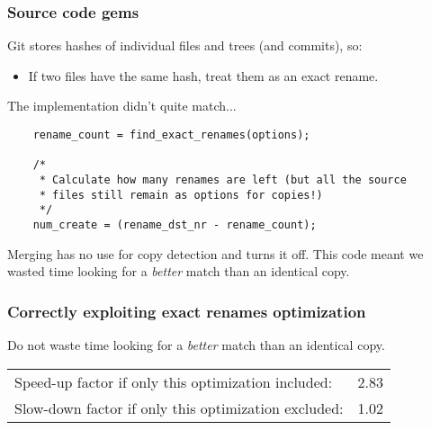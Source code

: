 \documentclass[compress,t]{beamer}
\begin{document}
\begin{frame}[fragile]
  \frametitle{Source code gems}

  Git stores hashes of individual files and trees (and commits), so:
  \begin{itemize}
    \item If two files have the same hash, treat them as an exact rename.
  \end{itemize}

  \pause
  \vspace*{1.0\baselineskip}
  The implementation didn't quite match...\\
  \vspace*{0.5\baselineskip}
  \qquad
  \begin{minipage}{0.8\textwidth}
  {\footnotesize
  \begin{verbatim}
	rename_count = find_exact_renames(options);

	/*
	 * Calculate how many renames are left (but all the source
	 * files still remain as options for copies!)
	 */
	num_create = (rename_dst_nr - rename_count);
  \end{verbatim}
  }
  \end{minipage}

  \pause
  \vspace*{1.0\baselineskip}
  Merging has no use for copy detection and turns it off.
  \pause
  This code meant we wasted time looking for a \textit{better} match than
  an identical copy.

\end{frame}


\begin{frame}
  \frametitle{Correctly exploiting exact renames optimization}

  Do not waste time looking for a \textit{better} match than an
  identical copy.

  \pause
  \vspace*{\baselineskip}
  \begin{tabular}{lr}
    Speed-up factor if only this optimization included:  & 2.83 \\
    Slow-down factor if only this optimization excluded: & 1.02
  \end{tabular}

\end{frame}

\end{document}
